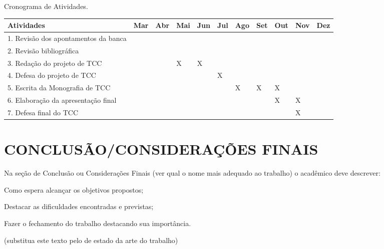 \begin{quadro}[!htb]
    \caption{Cronograma de Atividades.\label{qua:quadro1}}
    \begin{tabular}{|p{4.5cm}|p{0.7cm}|p{0.7cm}|p{0.7cm}|p{0.7cm}|p{0.7cm}|p{0.7cm}|p{0.7cm}|p{0.7cm}|p{0.7cm}|p{0.7cm}|}
        \hline
        \textbf{Atividades} & \textbf{Mar} & \textbf{Abr} & \textbf{Mai} & \textbf{Jun} & \textbf{Jul} & \textbf{Ago} & \textbf{Set} & \textbf{Out} & \textbf{Nov} & \textbf{Dez} \\
        \hline
        \small{1. Revisão dos apontamentos da banca} &   &   &   &   &   &   &   &   &   &  \\
        \hline
        \small{2. Revisão bibliográfica} &   &   &   &   &   &   &   &   &   &  \\
        \hline
	\small{3. Redação do projeto de TCC} &   &   & X & X &   &   &   &   &   &  \\
        \hline
	\small{4. Defesa do projeto de TCC} &   &   &   &   & X &   &   &   &   &  \\
        \hline
	\small{5. Escrita da Monografia de TCC} &   &   &   &   &   & X & X  & X &   &  \\
        \hline
	\small{6. Elaboração da apresentação final} &   &   &   &   &   &   &   & X & X &  \\
        \hline
	\small{7. Defesa final do TCC} &   &   &   &   &   &   &   &   & X &  \\
        \hline
    \end{tabular}
\end{quadro}




\section{CONCLUSÃO/CONSIDERAÇÕES FINAIS} %
\label{sec:conclusao}
Na seção de Conclusão ou Considerações Finais (ver qual o nome mais adequado ao trabalho) o acadêmico deve descrever:

Como espera alcançar os objetivos propostos;

Destacar as dificuldades encontradas e previstas;

Fazer o fechamento do trabalho destacando sua importância.

(substitua este texto pelo de estado da arte do trabalho)
